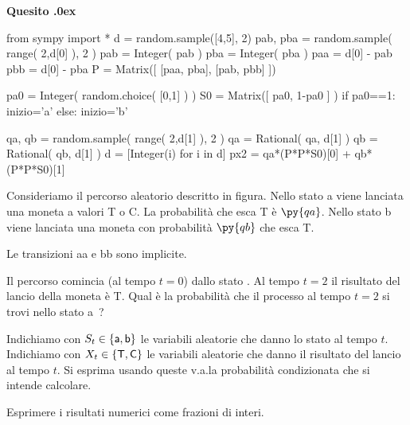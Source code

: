 \documentclass[11pt,twoside,a4paper]{article}
\newcounter{quesito}
\newenvironment{question}{\bigskip\addtocounter{quesito}{1}\bigskip\bigskip\par\textbf{Quesito \thequesito.\kern0ex}}{\par\vspace{\parskip}}
\begin{document}
\begin{question}%
\def\Pr{{\rm Pr\,}}
\def\pyl#1{\py{latex(#1)}}
\def\nicefrac#1#2{#1/#2}
\everymath{\displaystyle}
\renewcommand{\arraystretch}{1.3}
\begin{pycode}
from sympy import *
d =  random.sample([4,5], 2) 
pab, pba = random.sample( range( 2,d[0] ), 2 )
pab = Integer( pab )
pba = Integer( pba )
paa = d[0] - pab
pbb = d[0] - pba
P  = Matrix([ [paa, pba], 
              [pab, pbb] ])
        

pa0 = Integer( random.choice( [0,1] ) ) 
S0  = Matrix([ pa0, 1-pa0 ] ) 
if pa0==1: inizio='a' 
else: inizio='b' 

qa, qb = random.sample( range( 2,d[1] ), 2 ) 
qa = Rational( qa, d[1] ) 
qb = Rational( qb, d[1] ) 
d = [Integer(i) for i in d]
px2 = qa*(P*P*S0)[0] + qb*(P*P*S0)[1]


\end{pycode}
Consideriamo il percorso aleatorio descritto in figura. Nello stato {\sf a} viene lanciata una moneta a valori {\sf T} o {\sf C}. La probabilità che esca {\sf T} è $\py{qa}$. Nello stato {\sf b} viene lanciata una moneta con probabilità $\py{qb}$ che esca {\sf T}.

\hfil
{}
\hfil Le transizioni {\sf aa} e {\sf bb} sono implicite.

Il percorso comincia (al tempo $t{=}0$) dallo stato {\sf {}}. Al tempo $t=2$ il risultato del lancio della moneta è {\sf T}. Qual è la probabilità che il processo al tempo $t{=}2$ si trovi nello stato {\sf a}~?


Indichiamo con $S_t\in\{{\sf a}, {\sf b}\}$ le variabili aleatorie che danno lo stato al tempo $t$. Indichiamo con $X_t\in\{{\sf T}, {\sf C}\}$ le variabili aleatorie che danno il risultato del lancio al tempo $t$. Si esprima usando queste v.a.\@ la probabilità condizionata che si intende calcolare. 

Esprimere i risultati numerici come frazioni di interi.



\end{question}
\end{document}
